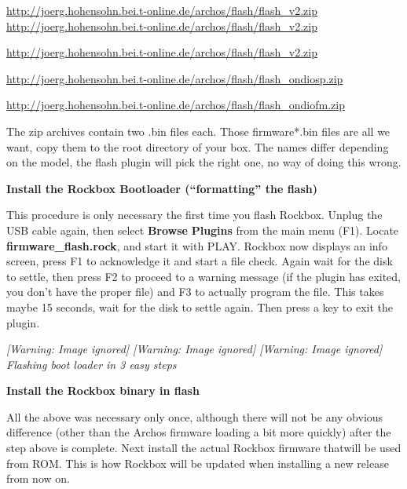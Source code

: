 \url{http://joerg.hohensohn.bei.t-online.de/archos/flash/flash_v2.zip}
\url{http://joerg.hohensohn.bei.t-online.de/archos/flash/flash_v2.zip}

\url{http://joerg.hohensohn.bei.t-online.de/archos/flash/flash_v2.zip}

\url{http://joerg.hohensohn.bei.t-online.de/archos/flash/flash_ondiosp.zip}

\url{http://joerg.hohensohn.bei.t-online.de/archos/flash/flash_ondiofm.zip}

The zip archives contain two .bin files each. Those firmware*.bin files
are all we want, copy them to the root directory of your box. The names
differ depending on the model, the flash
plugin will pick the right one, no way of
doing this wrong. 

{\bfseries
Install the Rockbox
Bootloader (``formatting'' the flash)}

This procedure is only necessary the first time you flash Rockbox. 
Unplug the USB cable again, then select \textbf{Browse
}\textbf{Plugins}\textbf{ } from the main menu (F1).  Locate \textbf{firmware\_flash.rock}, and start it with PLAY.  Rockbox now displays an info screen, press F1 to acknowledge it and start a file check. Again wait for the disk to
settle, then press F2 to proceed to a warning message (if the plugin
has exited, you don't have the proper file) and F3 to actually program
the file. This takes maybe 15 seconds, wait for the disk to settle
again. Then press a key to exit the plugin.

{\centering\itshape
  [Warning: Image ignored] %
     [Warning: Image ignored] %
 \textmd{  }  [Warning: Image ignored]
 \newline
Flashing boot loader in 3 easy steps
\par}

{\bfseries
\label{ref:FlashingRockbox}Install the Rockbox binary in flash}

All the above was necessary only once, although there will not be any
obvious difference (other than the Archos firmware loading a bit more quickly)
after the step above is complete.  Next install the actual Rockbox firmware thatwill be used from ROM.  This is how Rockbox will be updated when
installing a new release from now on. 

